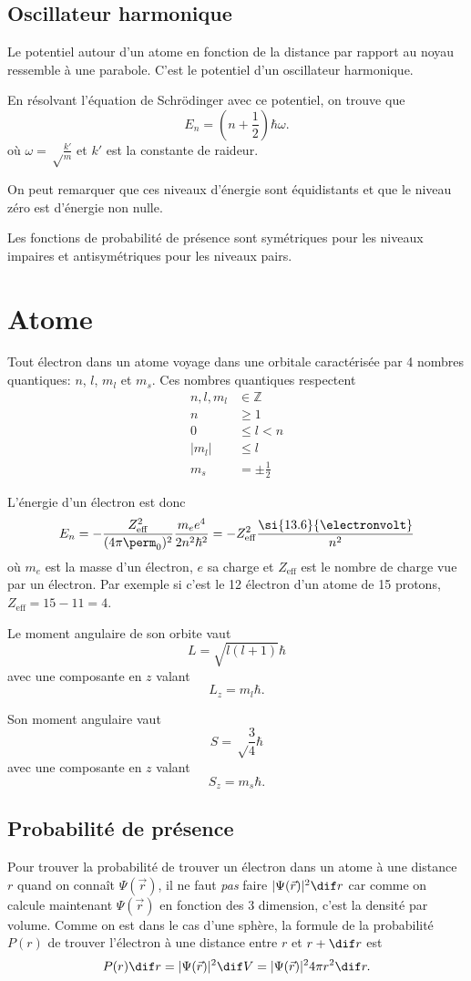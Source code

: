 \subsection{Oscillateur harmonique}
Le potentiel autour d'un atome en fonction de la distance
par rapport au noyau ressemble à une parabole.
C'est le potentiel d'un oscillateur harmonique.

En résolvant l'équation de Schrödinger avec ce potentiel,
on trouve que
\[ E_n = \left(n+\frac{1}{2}\right)\hbar\omega. \]
où $\omega = \sqrt\frac{k'}{m}$ et
$k'$ est la constante de raideur.

On peut remarquer que ces niveaux d'énergie sont équidistants et que
le niveau zéro est d'énergie non nulle.

Les fonctions de probabilité de présence sont symétriques pour les
niveaux impaires et antisymétriques pour les niveaux pairs.

\section{Atome}
Tout électron dans un atome voyage dans une orbitale caractérisée par
4 nombres quantiques: $n$, $l$, $m_l$ et $m_s$.
Ces nombres quantiques respectent
\begin{align*}
  n, l, m_l & \in \mathbb{Z}\\
  n & \geq 1\\
  0 & \leq l < n\\
  |m_l| & \leq l\\
  m_s & = \pm \frac12
\end{align*}

L'énergie d'un électron est donc
\[ E_n = -\frac{Z_\mathrm{eff}^2}{(4\pi\perm_0)^2}\frac{m_ee^4}{2n^2\hbar^2}
= -Z_\mathrm{eff}^2\frac{\si{13.6}{\electronvolt}}{n^2} \]
où $m_e$ est la masse d'un électron, $e$ sa charge et
$Z_\mathrm{eff}$ est le nombre de charge vue par un électron.
Par exemple si c'est le 12\ieme{} électron d'un atome de 15 protons,
$Z_\mathrm{eff} = 15 - 11 = 4$.

Le moment angulaire de son orbite vaut
\[ L = \sqrt{l(l+1)} \hbar \]
avec une composante en $z$ valant
\[ L_z = m_l \hbar. \]

Son moment angulaire vaut
\[ S = \sqrt\frac34 \hbar \]
avec une composante en $z$ valant
\[ S_z = m_s \hbar. \]

\subsection{Probabilité de présence}
Pour trouver la probabilité de trouver un électron dans un atome
à une distance $r$ quand on connaît $\Psi(\vec{r})$,
il ne faut \emph{pas} faire $|\Psi(\vec{r})|^2 \dif r$
car comme on calcule maintenant $\Psi(\vec{r})$ en fonction des 3 dimension,
c'est la densité par volume.
Comme on est dans le cas d'une sphère, la formule de la probabilité
$P(r)$ de trouver l'électron à une distance entre $r$ et $r+\dif r$ est
\[ P(r) \dif r = |\Psi(\vec{r})|^2 \dif V
= |\Psi(\vec{r})|^2 4\pi r^2 \dif r. \]

